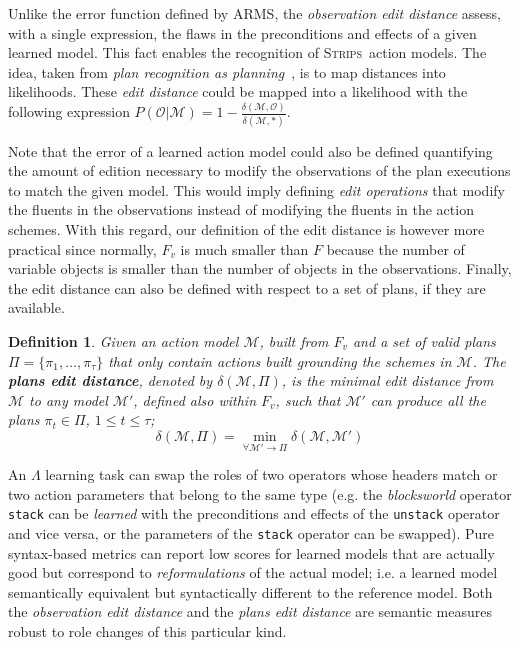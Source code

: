 \documentclass[3p,times]{elsarticle}
\newtheorem{mydefinition}[mytheorem]{Definition}
\newcommand{\strips}{\textsc{Strips}}     %
\begin{document}
Unlike the error function defined by {\sc ARMS}, the {\em observation edit distance} assess, with a single expression, the flaws in the preconditions and effects of a given learned model. This fact enables the recognition of \strips\ action models. The idea, taken from {\em plan recognition as planning}~\cite{ramirez2009plan}, is to map distances into likelihoods. These {\em edit distance} could be mapped into a likelihood with the following expression $P(\mathcal{O}|\mathcal{M})=1-\frac{\delta(\mathcal{M},\mathcal{O})}{\delta(\mathcal{M},*)}$.

Note that the error of a learned action model could also be defined quantifying the amount of edition necessary to modify the observations of the plan executions to match the given model. This would imply defining {\em edit operations} that modify the fluents in the observations instead of modifying the fluents in the action schemes. With this regard, our definition of the edit distance is however more practical since normally, $F_v$ is much smaller than $F$ because the number of variable objects is smaller than the number of objects in the observations. Finally, the edit distance can also be defined with respect to a set of plans, if they are available. 

\begin{mydefinition}
  Given an action model $\mathcal{M}$, built from $F_v$ and a set of valid plans $\Pi=\{\pi_1,\ldots,\pi_{\tau}\}$ that only contain actions built grounding the schemes in $\mathcal{M}$. The {\bf plans edit distance}, denoted by  $\delta(\mathcal{M},\Pi)$, is the minimal edit distance from $\mathcal{M}$ to any model $\mathcal{M}'$, defined also within $F_v$, such that $\mathcal{M}'$ can produce all the plans $\pi_t\in \Pi$, {\tt\small $1\leq t\leq \tau$}; \[\delta(\mathcal{M},\Pi)=\min_{\forall \mathcal{M}' \rightarrow \Pi} \delta(\mathcal{M},\mathcal{M}')\]
\end{mydefinition}

An $\Lambda$ learning task can swap the roles of two operators whose headers match or two action parameters that belong to the same type (e.g. the {\em blocksworld} operator {\small\tt stack} can be {\em learned} with the preconditions and effects of the {\small\tt unstack} operator and vice versa, or the parameters of the {\small\tt stack} operator can be swapped). Pure syntax-based metrics can report low scores for learned models that are actually good but correspond to {\em reformulations} of the actual model; i.e. a learned model semantically equivalent but syntactically different to the reference model. Both the {\em observation edit distance} and the {\em plans edit distance} are semantic measures robust to role changes of this particular kind.
\end{document}
